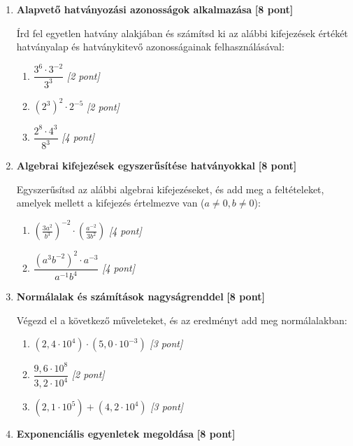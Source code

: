 \documentclass[11pt,a4paper]{article}
\begin{document}
\begin{enumerate}
    \item \textbf{Alapvető hatványozási azonosságok alkalmazása} \hfill \textbf{[8 pont]}
    
    Írd fel egyetlen hatvány alakjában és számítsd ki az alábbi kifejezések értékét hatványalap és hatványkitevő azonosságainak felhasználásával:
    \begin{enumerate}
        \item $\dfrac{3^6 \cdot 3^{-2}}{3^3}$ \hfill \textit{[2 pont]}
        \item $(2^3)^2 \cdot 2^{-5}$ \hfill \textit{[2 pont]}
        \item $\dfrac{2^8 \cdot 4^3}{8^3}$ \hfill \textit{[4 pont]}
    \end{enumerate}

    \vspace{2mm}
    \item \textbf{Algebrai kifejezések egyszerűsítése hatványokkal} \hfill \textbf{[8 pont]}
    
    Egyszerűsítsd az alábbi algebrai kifejezéseket, és add meg a feltételeket, amelyek mellett a kifejezés értelmezve van ($a \neq 0, b \neq 0$):
    \begin{enumerate}
        \item $\left(\frac{3a^2}{b^3}\right)^{-2} \cdot \left(\frac{a^{-2}}{3b^2}\right)$ \hfill \textit{[4 pont]}
        \item $\dfrac{(a^3 b^{-2})^2 \cdot a^{-3}}{a^{-1} b^4}$ \hfill \textit{[4 pont]}
    \end{enumerate}

    \vspace{2mm}
    \item \textbf{Normálalak és számítások nagyságrenddel} \hfill \textbf{[8 pont]}
    
    Végezd el a következő műveleteket, és az eredményt add meg normálalakban:
    \begin{enumerate}
        \item $(2,4 \cdot 10^4) \cdot (5,0 \cdot 10^{-3})$ \hfill \textit{[3 pont]}
        \item $\dfrac{9,6 \cdot 10^8}{3,2 \cdot 10^4}$ \hfill \textit{[2 pont]}
        \item $(2,1 \cdot 10^5) + (4,2 \cdot 10^4)$ \hfill \textit{[3 pont]}
    \end{enumerate}

    \vspace{2mm}
    \item \textbf{Exponenciális egyenletek megoldása} \hfill \textbf{[8 pont]}
    

\end{enumerate}
\end{document}
